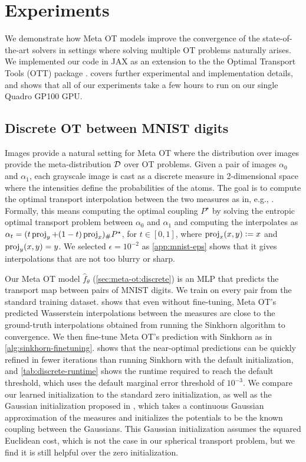\documentclass{article}
\newcommand{\eg}{e.g.\xspace}
\newcommand{\defeq}{\vcentcolon=}
\begin{document}
\section{Experiments}\label{sec:experiments}
We demonstrate how Meta OT models improve the convergence
of the state-of-the-art solvers in settings where
solving multiple OT problems naturally arises.
We implemented our code in JAX \citep{jax2018github} as an
extension to the the Optimal Transport Tools (OTT)
package \citep{cuturi2022optimal}.
 covers further experimental
and implementation details, and shows that all of our
experiments take a few hours to
run on our single Quadro GP100 GPU.

\subsection{Discrete OT between MNIST digits}
\label{sec:exp:mnist}
Images provide a natural setting for Meta OT where the
distribution over images provide the meta-distribution
${\mathcal{D}}$ over OT problems.
Given a pair of images $\alpha_0$ and
$\alpha_1$, each grayscale image is cast as a discrete measure
in 2-dimensional space where the intensities define the probabilities of the atoms.
The goal is to compute the optimal transport interpolation between the
two measures as in, \eg, \citet[\S7]{peyre2019computational}.
Formally, this means computing the optimal coupling $P^\star$
by solving the entropic optimal transport problem between $\alpha_0$ and
$\alpha_1$ and computing the interpolates as
$\alpha_t = (t\operatorname*{proj}_y+(1-t)\operatorname*{proj}_x) _{\#}P^\star$, for $t\in [0,1]$,
where $\proj_x(x,y)\defeq x$ and $\operatorname*{proj}_y(x,y)=y$.
We selected $\epsilon=10^{-2}$ as \cref{app:mnist-eps} shows that
it gives interpolations that are not too blurry or sharp.

Our Meta OT model $\hat f_\theta$ (\cref{sec:meta-ot:discrete})
is an MLP that predicts the transport map between pairs of MNIST digits.
We train on every pair from the standard training dataset.
 shows that even without fine-tuning,
Meta OT's predicted Wasserstein interpolations between
the measures are close to the ground-truth interpolations
obtained from running the Sinkhorn algorithm to convergence.
We then fine-tune Meta OT's prediction with Sinkhorn as in
\cref{alg:sinkhorn-finetuning}.
 shows that the near-optimal predictions
can be quickly refined in fewer iterations than running
Sinkhorn with the default initialization,
and \cref{tab:discrete-runtime} shows the runtime required
to reach the default threshold, which uses the default marginal error threshold of $10^{-3}$.
We compare our learned initialization to the standard zero initialization,
as well as the Gaussian initialization proposed in \citet{thornton2022rethinking},
which takes a continuous Gaussian approximation of the measures and initializes
the potentials to be the known coupling between the Gaussians.
This Gaussian initialization assumes the squared Euclidean cost,
which is not the case in our spherical transport problem,
but we find it is still helpful over the zero initialization.
\end{document}

